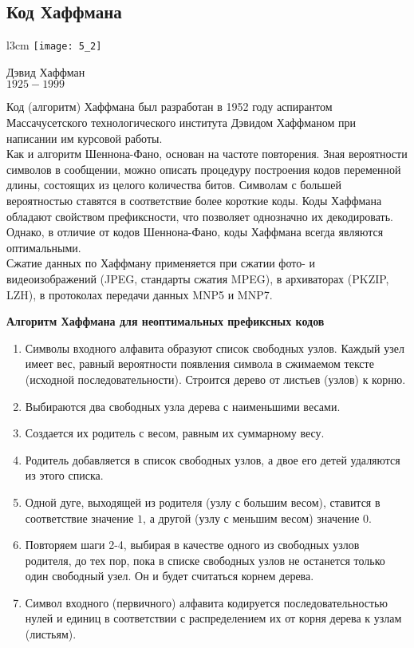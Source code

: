 \subsection{Код Хаффмана}
\begin{wrapfigure}[14]{l}{3cm}
\texttt{[image: 5\_2]}
\begin{center}
\caption{}
\footnotesize{Дэвид Хаффман}
\\\footnotesize{$1925 - 1999$}
\end{center}
\end{wrapfigure}
Код (алгоритм) Хаффмана был разработан в 1952 году аспирантом Массачусетского технологического института Дэвидом Хаффманом при написании им курсовой работы.
\\Как и алгоритм Шеннона-Фано, основан на частоте повторения. Зная вероятности символов в сообщении, можно описать процедуру построения кодов переменной длины, состоящих из целого количества битов. Символам с большей вероятностью ставятся в соответствие более короткие коды. Коды Хаффмана обладают свойством префиксности, что позволяет однозначно их декодировать.
\\Однако, в отличие от кодов Шеннона-Фано, коды Хаффмана всегда являются оптимальными.
\\Сжатие данных по Хаффману применяется при сжатии фото- и видеоизображений (JPEG, стандарты сжатия MPEG), в архиваторах (PKZIP, LZH), в протоколах передачи данных MNP5 и MNP7.
\begin{center}
  \textbf{Алгоритм Хаффмана для неоптимальных префиксных кодов}
\end{center}

\begin{enumerate}
  \item Символы входного алфавита образуют список свободных узлов. Каждый узел имеет вес, равный вероятности появления символа в сжимаемом тексте (исходной последовательности). Строится дерево от листьев (узлов) к корню.
  \item Выбираются два свободных узла дерева с наименьшими весами.
  \item Создается их родитель с весом, равным их суммарному весу.
  \item Родитель добавляется в список свободных узлов, а двое его детей удаляются из этого списка.
  \item Одной дуге, выходящей из родителя (узлу с большим весом), ставится в соответствие значение $1$, а другой (узлу с меньшим весом) значение $0$.
  \item Повторяем шаги 2-4, выбирая в качестве одного из свободных узлов родителя, до тех пор, пока в списке свободных узлов не останется только один свободный узел. Он и будет считаться корнем дерева.
  \item Символ входного (первичного) алфавита кодируется последовательностью нулей и единиц в соответствии с распределением их от корня дерева к узлам (листьям).
\end{enumerate}

